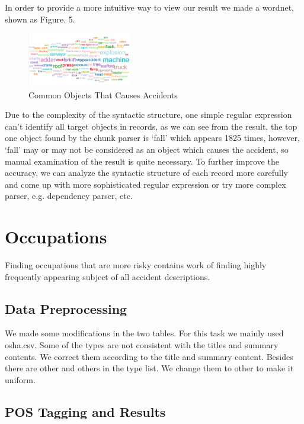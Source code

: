 \documentclass[DIV=calc, paper=a4, fontsize=11pt, twocolumn]{scrartcl}	 %
\begin{document}
In order to provide a more intuitive way to view our result we made a
wordnet, shown as Figure. 5.


\begin{figure}[h!]
  \centering
      \includegraphics[width=0.4\textwidth]{common_objects.png}
   \caption{Common Objects That Causes Accidents}
\end{figure}


Due to the complexity of the syntactic structure, one simple regular
expression can’t identify all target objects in records, as we can see
from the result, the top one object found by the chunk parser is
‘fall’ which appears 1825 times, however, ‘fall’ may or may not be
considered as an object which causes the accident, so manual
examination of the result is quite necessary. To further improve the
accuracy, we can analyze the syntactic structure of each record more
carefully and come up with more sophisticated regular expression or
try more complex parser, e.g. dependency parser, etc.



\section{Occupations}

Finding occupations that are more risky contains work of finding
highly frequently appearing subject of all accident descriptions.

\subsection{Data Preprocessing}
We made some modifications in the two tables. For this task we mainly
used osha.csv. Some of the types are not consistent with the titles
and summary contents. We correct them according to the title and
summary content. Besides there are other and others in the type
list. We change them to other to make it uniform.


\subsection{POS Tagging and Results}
\end{document}
